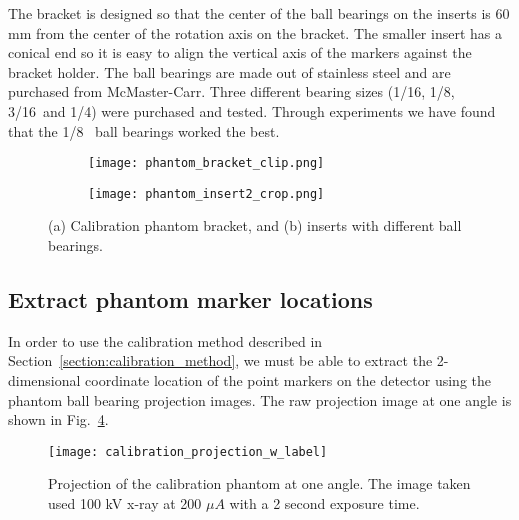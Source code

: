 The bracket is designed so that the center of the ball bearings on the inserts is 60 mm from the center of the rotation axis on the bracket.  The smaller insert has a conical end so it is easy to align the vertical axis of the markers against the bracket holder.  The ball bearings are made out of stainless steel and are purchased from McMaster-Carr.  Three different bearing sizes (1/16\inches, 1/8\inches,~ 3/16\inches ~and 1/4\inches) were purchased and tested.  Through experiments we have found that the 1/8\inches~ ball bearings worked the best.
%
\begin{figure}[ht]
	\begin{subfigure}[b]{0.3\linewidth}
	\texttt{[image: phantom\_bracket\_clip.png]}
	\label{fig:calibration_phantom_bracket}
	\caption{}
	\end{subfigure}
\hspace{0.2cm}
	\begin{subfigure}[b]{0.3\linewidth}
	\texttt{[image: phantom\_insert2\_crop.png]}
	\label{fig:calibration_phantom_insert}
	\caption{}
	\end{subfigure}
\caption{(a) Calibration phantom bracket, and (b) inserts with different ball bearings.}
\label{fig:calibration_phantom}
\end{figure}

\subsection{Extract phantom marker locations}
In order to use the calibration method described in Section~\ref{section:calibration_method}, we must be able to extract the 2-dimensional coordinate location of the point markers on the detector using the phantom ball bearing projection images.  The raw projection image at one angle is shown in Fig.~\ref{fig:calibration_projection}.
%
\begin{figure}[ht]
\centering
\texttt{[image: calibration\_projection\_w\_label]}
\caption{Projection of the calibration phantom at one angle.  The image taken used 100 kV x-ray at 200 $\mu A$ with a 2 second exposure time.}
\label{fig:calibration_projection}
\end{figure}

